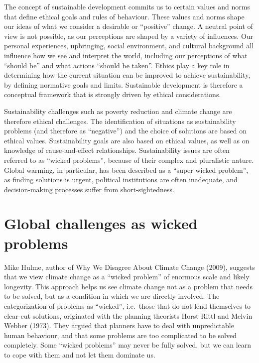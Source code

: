 \documentclass[
  letterpaper,
  DIV=11,
  numbers=noendperiod]{scrreprt}
\begin{document}
The concept of sustainable development commits us to certain values and
norms that define ethical goals and rules of behaviour. These values and
norms shape our ideas of what we consider a desirable or ``positive''
change. A neutral point of view is not possible, as our perceptions are
shaped by a variety of influences. Our personal experiences, upbringing,
social environment, and cultural background all influence how we see and
interpret the world, including our perceptions of what ``should be'' and
what actions ``should be taken''. Ethics play a key role in determining
how the current situation can be improved to achieve sustainability, by
defining normative goals and limits. Sustainable development is
therefore a conceptual framework that is strongly driven by ethical
considerations.

Sustainability challenges such as poverty reduction and climate change
are therefore ethical challenges. The identification of situations as
sustainability problems (and therefore as ``negative'') and the choice
of solutions are based on ethical values. Sustainability goals are also
based on ethical values, as well as on knowledge of cause-and-effect
relationships. Sustainability issues are often referred to as ``wicked
problems'', because of their complex and pluralistic nature. Global
warming, in particular, has been described as a ``super wicked
problem'', as finding solutions is urgent, political institutions are
often inadequate, and decision-making processes suffer from
short-sightedness.

\section{Global challenges as wicked
problems}\label{global-challenges-as-wicked-problems}

Mike Hulme, author of Why We Disagree About Climate Change (2009),
suggests that we view climate change as a ``wicked problem'' of enormous
scale and likely longevity. This approach helps us see climate change
not as a problem that needs to be solved, but as a condition in which we
are directly involved. The categorization of problems as ``wicked'',
i.e.~those that do not lend themselves to clear-cut solutions,
originated with the planning theorists Horst Rittl and Melvin Webber
(1973). They argued that planners have to deal with unpredictable human
behaviour, and that some problems are too complicated to be solved
completely. Some ``wicked problems'' may never be fully solved, but we
can learn to cope with them and not let them dominate us.
\end{document}
